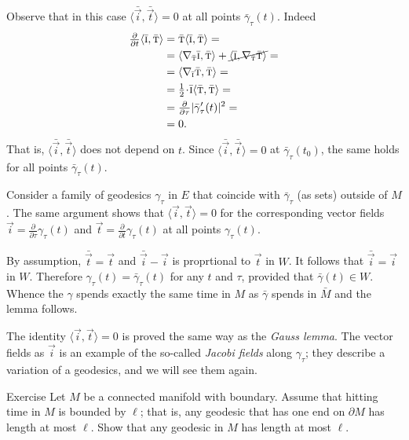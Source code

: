 Observe that in this case $\langle\bar{\vec i},\bar{\vec t}\rangle=0$ at all points $\bar\gamma_\tau(t)$.
Indeed 
\begin{align*}
\tfrac{\partial}{\partial t}\langle\bar{\vec i},\bar{\vec t}\rangle&=
\bar{\vec t}\langle\bar{\vec i},\bar{\vec t}\rangle=
\\
&=
\langle\nabla_{\bar{\vec t}}\bar{\vec i},\bar{\vec t}\rangle+\cancel{\langle\bar{\vec i},\nabla_{\bar{\vec t}}\bar{\vec t}\rangle}=
\\
&=\langle\nabla_{\bar{\vec i}}\bar{\vec t},\bar{\vec t}\rangle=
\\
&=\tfrac12\cdot\bar{\vec i}\langle\bar{\vec t},\bar{\vec t}\rangle=
\\
&=\tfrac{\partial}{\partial \tau}|\bar\gamma_\tau'(t)|^2=
\\
&=0.
\end{align*}
That is, $\langle\bar{\vec i},\bar{\vec t}\rangle$ does not depend on $t$.
Since $\langle\bar{\vec i},\bar{\vec t}\rangle=0$ at $\bar\gamma_\tau(t_0)$, the same holds for all points  $\bar\gamma_\tau(t)$.

Consider a family of geodesics $\gamma_\tau$ in $E$ that coincide with $\bar\gamma_\tau$ (as sets) outside of $M$.
The same argument shows that $\langle\vec i,\vec t\rangle=0$ for the corresponding vector fields ${\vec i}
=\tfrac{\partial}{\partial\tau}\gamma_\tau(t)$ and $\vec t
=\tfrac{\partial}{\partial t}\gamma_\tau(t)$
at all points $\gamma_\tau(t)$.

By assumption, $\bar{\vec t}=\vec t$ and
$\bar{\vec i}-\vec i$ is proprtional to $\vec t$ in $W$.
It follows that $\bar{\vec i}=\vec i$ in $W$.
Therefore $\gamma_\tau(t)=\bar\gamma_\tau(t)$ for any $t$ and $\tau$, provided that $\bar\gamma(t)\in W$.
Whence the $\gamma$ spends exactly the same time in $M$ as 
$\bar \gamma$ spends in $\bar M$ and the lemma follows.\qeds

The identity $\langle\vec i,\vec t\rangle=0$ is proved the same way as the \emph{Gauss lemma}.
The vector fields as $\vec i$ is an example of the so-called \emph{Jacobi fields} along $\gamma_\tau$;
they describe a variation of a geodesics, and we will see them again.

\begin{thm}{Exercise}\label{ex:exit-time}
Let $M$ be a connected manifold with boundary.
Assume that hitting time in $M$ is bounded by $\ell$;
that is, any geodesic that has one end on $\partial M$ has length at most $\ell$.
Show that any geodesic in $M$ has length at most $\ell$.
\end{thm}

